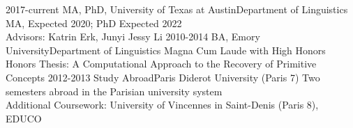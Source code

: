 %
%
%



\begin{education}
  \school
    {2017-current}   {}{MA, PhD, University of Texas at Austin}{Department of Linguistics}
    {} {
                      MA, Expected 2020; PhD Expected 2022\\
                      Advisors: Katrin Erk, Junyi Jessy Li
                    }
  \emptySeparator
  \school
    {2010-2014}   {BA, }{Emory University}{Department of Linguistics}
    {} {            
                      Magna Cum Laude with High Honors\\
                      Honors Thesis: A Computational Approach to the Recovery of Primitive Concepts
                    }
  \emptySeparator
   \school
    {2012-2013}   {}{Study Abroad}{Paris Diderot University (Paris 7)}
    {} {            
                     Two semesters abroad in the Parisian university system\\
                     Additional Coursework: 
                    University of Vincennes in Saint-Denis (Paris 8), 
                    EDUCO
                    }
  \emptySeparator
\end{education}
